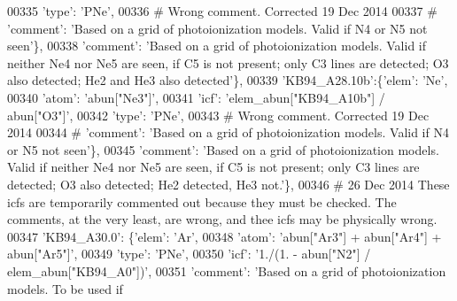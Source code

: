\begin{DoxyCode}
00335                                       \textcolor{stringliteral}{'type'}: \textcolor{stringliteral}{'PNe'},
00336 \textcolor{comment}{# Wrong comment. Corrected 19 Dec 2014}
00337 \textcolor{comment}{#                                      'comment': 'Based on a grid of photoionization models. Valid if N4
       or N5 not seen'\},}
00338                                       \textcolor{stringliteral}{'comment'}: \textcolor{stringliteral}{'Based on a grid of photoionization models. Valid if
       neither Ne4 nor Ne5 are seen, if C5 is not present; only C3 lines are detected; O3 also detected; He2 and He3
       also detected'}\},
00339                          \textcolor{stringliteral}{'KB94\_A28.10b'}:\{\textcolor{stringliteral}{'elem'}: \textcolor{stringliteral}{'Ne'},
00340                                      \textcolor{stringliteral}{'atom'}: \textcolor{stringliteral}{'abun["Ne3"]'},
00341                                      \textcolor{stringliteral}{'icf'}: \textcolor{stringliteral}{'elem\_abun["KB94\_A10b"]  / abun["O3"]'},
00342                                       \textcolor{stringliteral}{'type'}: \textcolor{stringliteral}{'PNe'},
00343 \textcolor{comment}{# Wrong comment. Corrected 19 Dec 2014}
00344 \textcolor{comment}{#                                      'comment': 'Based on a grid of photoionization models. Valid if N4
       or N5 not seen'\},}
00345                                       \textcolor{stringliteral}{'comment'}: \textcolor{stringliteral}{'Based on a grid of photoionization models. Valid if
       neither Ne4 nor Ne5 are seen, if C5 is not present; only C3 lines are detected; O3 also detected; He2 detected,
       He3 not.'}\},
00346 \textcolor{comment}{# 26 Dec 2014 These icfs are temporarily commented out because they must be checked. The comments, at the
       very least, are wrong, and thee icfs may be physically wrong.  }
00347                          \textcolor{stringliteral}{'KB94\_A30.0'}: \{\textcolor{stringliteral}{'elem'}: \textcolor{stringliteral}{'Ar'},
00348                                      \textcolor{stringliteral}{'atom'}: \textcolor{stringliteral}{'abun["Ar3"] + abun["Ar4"] + abun["Ar5"]'},
00349                                      \textcolor{stringliteral}{'type'}: \textcolor{stringliteral}{'PNe'},
00350                                      \textcolor{stringliteral}{'icf'}: \textcolor{stringliteral}{'1./(1. - abun["N2"] / elem\_abun["KB94\_A0"])'},
00351                                       \textcolor{stringliteral}{'comment'}: \textcolor{stringliteral}{'Based on a grid of photoionization models. To be used if
}
\end{DoxyCode}
